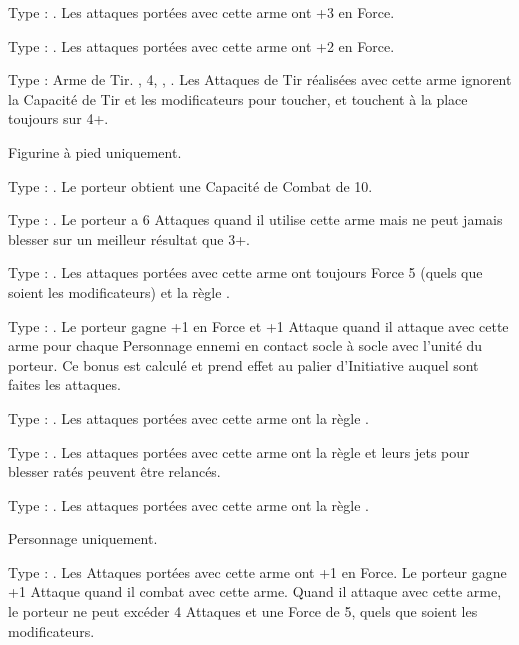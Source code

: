 Type : \hw{}.  Les attaques portées avec cette arme ont +3 en Force.

Type : \hw{}. Les attaques portées avec cette arme ont +2 en Force.

Type : Arme de Tir. , \Strength{} 4, , . Les Attaques de Tir réalisées avec cette arme ignorent la Capacité de Tir et les modificateurs pour toucher, et touchent à la place toujours sur 4+.

Figurine à pied uniquement.

Type : \pw{}. Le porteur obtient une Capacité de Combat de 10.

Type : \hw{}. Le porteur a 6 Attaques quand il utilise cette arme mais ne peut jamais blesser sur un meilleur résultat que 3+.

Type : \halberd{}. Les attaques portées avec cette arme ont toujours Force 5 (quels que soient les modificateurs) et la règle .

Type : \hw{}. Le porteur gagne +1 en Force et +1 Attaque quand il attaque avec cette arme pour chaque Personnage ennemi en contact socle à socle avec l'unité du porteur. Ce bonus est calculé et prend effet au palier d'Initiative auquel sont faites les attaques.

\columnbreak

Type : \hw{}. Les attaques portées avec cette arme ont la règle .

Type : \hw{}. Les attaques portées avec cette arme ont la règle \divineattacks{} et leurs jets pour blesser ratés peuvent être relancés.

Type : \gw{}. Les attaques portées avec cette arme ont la règle .

Personnage uniquement.

Type : \hw{}. Les Attaques portées avec cette arme ont +1 en Force. Le porteur gagne +1 Attaque quand il combat avec cette arme. Quand il attaque avec cette arme, le porteur ne peut excéder 4 Attaques et une Force de 5, quels que soient les modificateurs.

